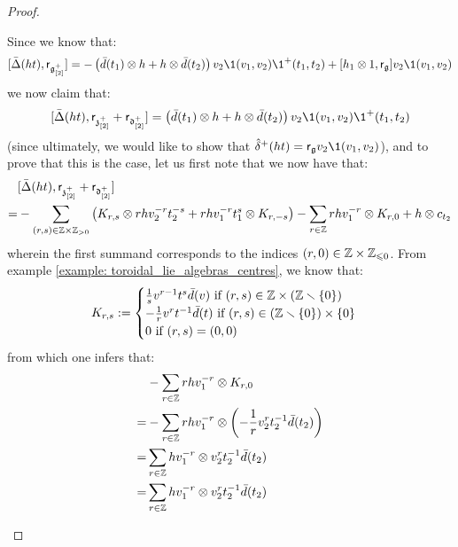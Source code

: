 \begin{proof}
\begin{enumerate}
                    Since we know that:
                        $$[\bar{\Delta}(ht), \sfr_{\g_{[2]}^{\positive}}] = -\left( \bar{d}(t_1) \tensor h + h \tensor \bar{d}(t_2) \right) v_2 \1(v_1, v_2) \1^+(t_1, t_2) + [h_1 \tensor 1, \sfr_{\g}] v_2 \1(v_1, v_2)$$
                    we now claim that:
                        $$[\bar{\Delta}(ht), \sfr_{\z_{[2]}^{\positive}} + \sfr_{\d_{[2]}^{\positive}}] = \left( \bar{d}(t_1) \tensor h + h \tensor \bar{d}(t_2) \right) v_2 \1(v_1, v_2) \1^+(t_1, t_2)$$
                    (since ultimately, we would like to show that $\hat{\delta}^{\positive}(ht) = \sfr_{\g} v_2 \1(v_1, v_2)$), and to prove that this is the case, let us first note that we now have that:
                        $$
                            \begin{aligned}
                                & [\bar{\Delta}(ht), \sfr_{\z_{[2]}^{\positive}} + \sfr_{\d_{[2]}^{\positive}}]
                                \\
                                = & -\sum_{(r, s) \in \Z \x \Z_{> 0}} \left( K_{r, s} \tensor r h v_2^{-r} t_2^{-s} + r h v_1^{-r} t_1^s \tensor K_{r, -s} \right) - \sum_{r \in \Z} r h v_1^{-r} \tensor K_{r, 0} + h \tensor c_{t_2}
                            \end{aligned}
                        $$
                    wherein the first summand corresponds to the indices $(r, 0) \in \Z \x \Z_{\leq 0}$. From example \ref{example: toroidal_lie_algebras_centres}, we know that:
                        $$
                            K_{r, s} :=
                            \begin{cases}
                                \text{$\frac1s v^{r - 1} t^s \bar{d}(v)$ if $(r, s) \in \Z \x (\Z \setminus \{0\})$}
                                \\
                                \text{$-\frac1r v^r t^{-1} \bar{d}(t)$ if $(r, s) \in (\Z \setminus \{0\}) \x \{0\}$}
                                \\
                                \text{$0$ if $(r, s) = (0, 0)$}
                            \end{cases}
                        $$
                    from which one infers that:
                        $$
                            \begin{aligned}
                                & -\sum_{r \in \Z} r h v_1^{-r} \tensor K_{r, 0}
                                \\
                                = & -\sum_{r \in \Z} r h v_1^{-r} \tensor \left( -\frac1r v_2^r t_2^{-1} \bar{d}(t_2) \right)
                                \\
                                = & \sum_{r \in \Z} h v_1^{-r} \tensor v_2^r t_2^{-1} \bar{d}(t_2)
                                \\
                                = & \sum_{r \in \Z} h v_1^{-r} \tensor v_2^r t_2^{-1} \bar{d}(t_2)
                            \end{aligned}
                        $$
                        

\end{enumerate}
\end{proof}

